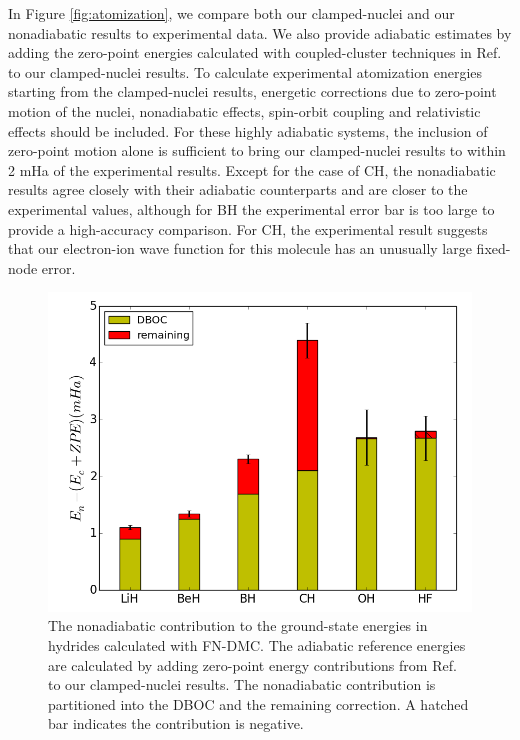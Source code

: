 \documentclass[aip,jcp,numerical,reprint]{revtex4-1}
\begin{document}
In Figure \ref{fig:atomization}, we compare both our clamped-nuclei and our nonadiabatic results to experimental data. We also provide adiabatic estimates by adding the zero-point energies calculated with coupled-cluster techniques in Ref.~\cite{Feller_Corrections} to our clamped-nuclei results. To calculate experimental atomization energies starting from the clamped-nuclei results, energetic corrections due to zero-point motion of the nuclei, nonadiabatic effects, spin-orbit coupling and relativistic effects should be included. For these highly adiabatic systems, the inclusion of zero-point motion alone is sufficient to bring our clamped-nuclei results to within 2 mHa of the experimental results. Except for the case of CH, the nonadiabatic results agree closely with their adiabatic counterparts and are closer to the experimental values, although for BH the experimental error bar is too large to provide a high-accuracy comparison. For CH, the experimental result suggests that our electron-ion wave function for this molecule has an unusually large fixed-node error.

\begin{figure}[h]
\includegraphics[scale=.4]{dia-nad-ad}
\caption{The nonadiabatic contribution to the ground-state energies in hydrides calculated with FN-DMC. The adiabatic reference energies are calculated by adding zero-point energy contributions from Ref.~\cite{Feller_Corrections} to our clamped-nuclei results. The nonadiabatic contribution is partitioned into the DBOC and the remaining correction. A hatched bar indicates the contribution is negative. \label{fig:dia-nad-ad}}
\end{figure}
\end{document}
